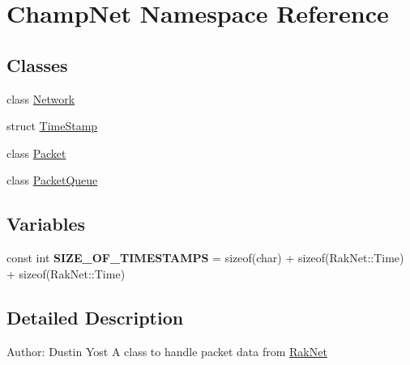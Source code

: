 \hypertarget{namespace_champ_net}{\section{Champ\-Net Namespace Reference}
\label{namespace_champ_net}
}
\subsection*{Classes}
\begin{DoxyCompactItemize}
\item 
class \hyperlink{class_champ_net_1_1_network}{Network}
\item 
struct \hyperlink{struct_champ_net_1_1_time_stamp}{Time\-Stamp}
\item 
class \hyperlink{class_champ_net_1_1_packet}{Packet}
\item 
class \hyperlink{class_champ_net_1_1_packet_queue}{Packet\-Queue}
\end{DoxyCompactItemize}
\subsection*{Variables}
\begin{DoxyCompactItemize}
\item 
\hypertarget{namespace_champ_net_ae8bece8e869e20f234d9ae67256a735f}{const int {\bfseries S\-I\-Z\-E\-\_\-\-O\-F\-\_\-\-T\-I\-M\-E\-S\-T\-A\-M\-P\-S} = sizeof(char) + sizeof(Rak\-Net\-::\-Time) + sizeof(Rak\-Net\-::\-Time)}\label{namespace_champ_net_ae8bece8e869e20f234d9ae67256a735f}

\end{DoxyCompactItemize}


\subsection{Detailed Description}
Author\-: Dustin Yost A class to handle packet data from \hyperlink{namespace_rak_net}{Rak\-Net} 